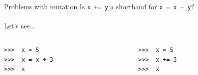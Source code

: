 \documentclass{beamer}
\newcommand{\prompt}{\phantom{}>\phantom{}>\phantom{}>\ }
\begin{document}
\begin{frame}{Problems with mutation} 
  Is \texttt{x += y} a shorthand for \texttt{x = x + y}? \\ \pause
  \ \\
  Let's see... \\ \pause
  \begin{columns}[T] %
    \begin{column}{.48\textwidth}
      \begin{small}
        \texttt{\prompt{} x = 5\\ \pause
          \prompt{} x = x + 3 \\ \pause
          \prompt{} x \\  \\ \pause
          \ \\ \ \\ \ \\ \ \\ \ \\ \ \\ \ \\ \ \\
        }
      \end{small}
    \end{column}%
    \hfill%
    \begin{column}{.48\textwidth}
      \begin{small}
        \texttt{\prompt{} x = 5\\ \pause
          \prompt{} x += 3 \\ \pause
          \prompt{} x \\  \\
          \ \\ \ \\ \ \\ \ \\ \ \\ \ \\ \ \\ \ \\
        }
      \end{small}
    \end{column}
  \end{columns} 
\end{frame}
\end{document}
